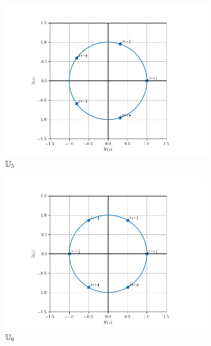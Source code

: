 \begin{figure}
\begin{subfigure}{.3\textwidth}
    \includegraphics[scale = 0.33]{U_5.png}
    \caption{$\mathbb{U}_5$}\label{fig:U5}
  \end{subfigure}
  \newline
  \begin{subfigure}{.3\textwidth}
    \centering
    \includegraphics[scale = 0.33]{U_6.png}
    \caption{$\mathbb{U}_6$}\label{fig:U6}
  \end{subfigure}
  \begin{subfigure}{.3\textwidth}
    \centering

\end{subfigure}
\end{figure}
